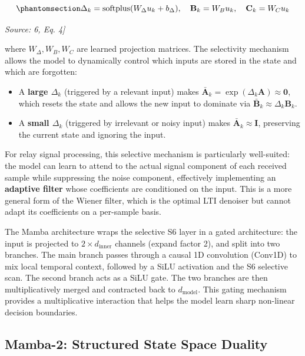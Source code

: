 \begin{equation}\protect\phantomsection\label{eq:mamba-selective}{\Delta_k = \text{softplus}(W_\Delta u_k + b_\Delta), \quad \mathbf{B}_k = W_B u_k, \quad \mathbf{C}_k = W_C u_k
}\end{equation} \par{\small\textit{Source: \cite{Laneman2004CooperativeDiversity}6, Eq. 4]}}

where \(W_\Delta, W_B, W_C\) are learned projection matrices. The selectivity mechanism allows the model to dynamically control which inputs are stored in the state and which are forgotten:

\begin{itemize}
\tightlist
\item
  A \textbf{large \(\Delta_k\)} (triggered by a relevant input) makes \(\bar{\mathbf{A}}_k = \exp(\Delta_k \mathbf{A}) \approx \mathbf{0}\), which resets the state and allows the new input to dominate via \(\bar{\mathbf{B}}_k \approx \Delta_k \mathbf{B}_k\).
\item
  A \textbf{small \(\Delta_k\)} (triggered by irrelevant or noisy input) makes \(\bar{\mathbf{A}}_k \approx \mathbf{I}\), preserving the current state and ignoring the input.
\end{itemize}

For relay signal processing, this selective mechanism is particularly well-suited: the model can learn to attend to the actual signal component of each received sample while suppressing the noise component, effectively implementing an \textbf{adaptive filter} whose coefficients are conditioned on the input. This is a more general form of the Wiener filter, which is the optimal LTI denoiser but cannot adapt its coefficients on a per-sample basis.

The Mamba architecture wraps the selective S6 layer in a gated architecture: the input is projected to \(2 \times d_{\text{inner}}\) channels (expand factor 2), and split into two branches. The main branch passes through a causal 1D convolution (Conv1D) to mix local temporal context, followed by a SiLU activation and the S6 selective scan. The second branch acts as a SiLU gate. The two branches are then multiplicatively merged and contracted back to \(d_{\text{model}}\). This gating mechanism provides a multiplicative interaction that helps the model learn sharp non-linear decision boundaries.

\subsection{Mamba-2: Structured State Space Duality}\label{sec:mamba-2-structured-state-space-duality}

